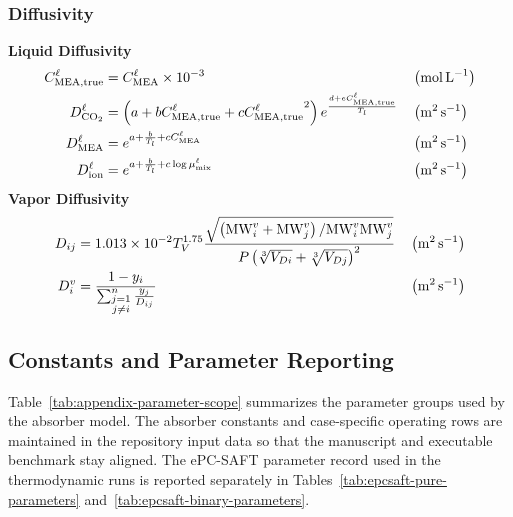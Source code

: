             \subsubsection{Diffusivity}
                \textbf{Liquid Diffusivity}
                \begin{align}
                    C^{\liq}_{\MEA,\text{true}} &= C^{\liq}_{\MEA} \times 10^{-3}
                    && \left(\unit{mol\,L^{-1}}\right)\\
                    D^{\liq}_{ \COtwo} &= \left(a + b C^{\liq}_{\MEA,\text{true}} + c {C^{\liq}_{\MEA,\text{true}}}^2\right) e^{\frac{d + e C^{\liq}_{\MEA,\text{true}}}{T_l}}
                    && \left(\unit{m^{2}\,s^{-1}}\right)\\
                    D^{\liq}_{ \MEA} &= e^{a + \frac{b}{T_l} + c C^{\liq}_{\MEA}}
                    && \left(\unit{m^{2}\,s^{-1}}\right)\\
                    D^{\liq}_{ \text{ion}} &= e^{a + \frac{b}{T_l} + c \log{\mu ^{\liq}_{ \text{mix}}}}
                    && \left(\unit{m^{2}\,s^{-1}}\right)
                \end{align}
                \vspace{.5cm}
                \textbf{Vapor Diffusivity}
                \begin{align}
                    D_{i j} &= 1.013 \times 10^{-2} T_V^{1.75} \frac{\sqrt{\left(\text{MW}^{\vap}_{i}+\text{MW}^{\vap}_{j}\right) / \text{MW}^{\vap}_{i} \text{MW}^{\vap}_{j}}}{P\left(\sqrt[3]{V_{D i}}+\sqrt[3]{V_{D j}}\right)^2}
                    && \left(\unit{m^{2}\,s^{-1}}\right)\\
                    D^{\vap}_{ i} &= \frac{1-y_i}{\sum_{\substack{j=1 \\ j \neq i}}^n \frac{y_j}{D_{i j}}}
                    && \left(\unit{m^{2}\,s^{-1}}\right)
                \end{align}

        \newpage
        \subsection{Constants and Parameter Reporting}\label{sec:appendix-properties}
            Table~\ref{tab:appendix-parameter-scope} summarizes the parameter groups used by the absorber model. The absorber constants and case-specific operating rows are maintained in the repository input data so that the manuscript and executable benchmark stay aligned. The ePC-SAFT parameter record used in the thermodynamic runs is reported separately in Tables~\ref{tab:epcsaft-pure-parameters} and~\ref{tab:epcsaft-binary-parameters}.

